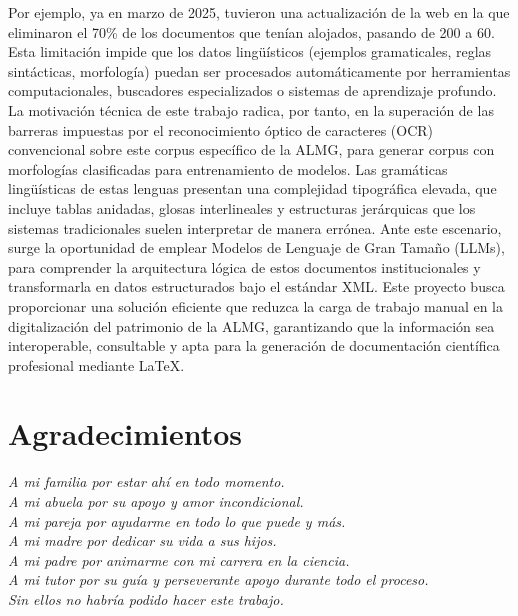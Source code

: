 Por ejemplo, ya en marzo de 2025, tuvieron una actualización de la web en la que eliminaron el 70\% de los documentos que tenían alojados, pasando de 200 a 60.
Esta limitación impide que los datos lingüísticos (ejemplos gramaticales, reglas sintácticas, morfología) puedan ser procesados automáticamente por herramientas computacionales, buscadores especializados o sistemas de aprendizaje profundo. La motivación técnica de este trabajo radica, por tanto, en la superación de las barreras impuestas por el reconocimiento óptico de caracteres (OCR) convencional sobre este corpus específico de la ALMG, para generar corpus con morfologías clasificadas para entrenamiento de modelos.
Las gramáticas lingüísticas de estas lenguas presentan una complejidad tipográfica elevada, que incluye tablas anidadas, glosas interlineales y estructuras jerárquicas que los sistemas tradicionales suelen interpretar de manera errónea. Ante este escenario, surge la oportunidad de emplear Modelos de Lenguaje de Gran Tamaño (LLMs), para comprender la arquitectura lógica de estos documentos institucionales y transformarla en datos estructurados bajo el estándar XML.
Este proyecto busca proporcionar una solución eficiente que reduzca la carga de trabajo manual en la digitalización del patrimonio de la ALMG, garantizando que la información sea interoperable, consultable y apta para la generación de documentación científica profesional mediante LaTeX.




\cleardoublepage %
\chapter*{Agradecimientos}
\setlength{\leftmargin}{0.5\textwidth}
\setlength{\parsep}{0cm}
\addtolength{\topsep}{0.5cm}

\begin{flushright}
\small\em{
A mi familia por estar ahí en todo momento.\\
A mi abuela por su apoyo y amor incondicional.\\
A mi pareja por ayudarme en todo lo que puede y más.\\
A mi madre por dedicar su vida a sus hijos.\\
A mi padre por animarme con mi carrera en la ciencia.\\
A mi tutor por su guía y perseverante apoyo durante todo el proceso.\\
Sin ellos no habría podido hacer este trabajo.
}
\end{flushright}



